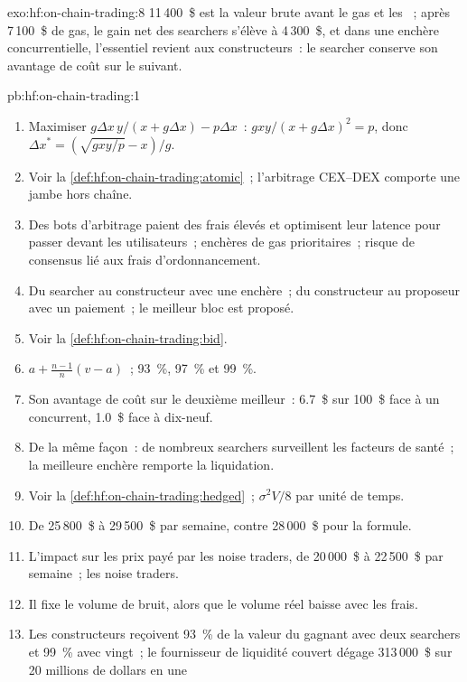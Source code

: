 \begin{solution}{exo:hf:on-chain-trading:8}
11\,400~\$ est la valeur brute avant le gas et les ~; après 7\,100~\$ de gas, le gain net des searchers s'élève à 4\,300~\$, et dans une
enchère concurrentielle, l'essentiel revient aux constructeurs~: le searcher conserve son avantage de coût sur le suivant.
\end{solution}

\begin{solution}{pb:hf:on-chain-trading:1}
\begin{enumerate}
\item Maximiser $g\Delta x\,y/(x+g\Delta x)-p\Delta x$~: $g xy/(x+g\Delta x)^2=p$, donc $\Delta x^\ast=(\sqrt{gxy/p}-x)/g$.
\item Voir la \cref{def:hf:on-chain-trading:atomic}~; l'arbitrage CEX--DEX comporte une jambe hors chaîne.
\item Des bots d'arbitrage paient des frais élevés et optimisent leur latence pour passer devant les utilisateurs~; enchères de gas prioritaires~; risque de consensus lié aux frais d'ordonnancement.
\item Du searcher au constructeur avec une enchère~; du constructeur au proposeur avec un paiement~; le meilleur bloc est proposé.
\item Voir la \cref{def:hf:on-chain-trading:bid}.
\item $a+\frac{n-1}{n}(v-a)$~; 93~\%, 97~\% et 99~\%.
\item Son avantage de coût sur le deuxième meilleur~: 6.7~\$ sur 100~\$ face à un concurrent, 1.0~\$ face à dix-neuf.
\item De la même façon~: de nombreux searchers surveillent les facteurs de santé~; la meilleure enchère remporte la liquidation.
\item Voir la \cref{def:hf:on-chain-trading:hedged}~; $\sigma^2V/8$ par unité de temps.
\item De 25\,800~\$ à 29\,500~\$ par semaine, contre 28\,000~\$ pour la formule.
\item L'impact sur les prix payé par les noise traders, de 20\,000~\$ à 22\,500~\$ par semaine~; les noise traders.
\item Il fixe le volume de bruit, alors que le volume réel baisse avec les frais.
\item Les constructeurs reçoivent 93~\% de la valeur du gagnant avec deux searchers et 99~\% avec vingt~; le fournisseur de liquidité couvert dégage 313\,000~\$ sur 20 millions de dollars en une

\end{enumerate}
\end{solution}
